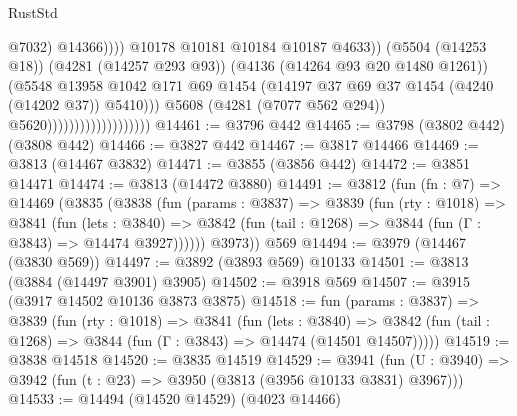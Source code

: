 \begin{lexlean}{RustStd}
\begin{coremodule}
{\begin{coremodule}
{{{{{{{{{{{{{{{{{{{{{{{{{{{{{{{{{{{                                                          @7032)
                                                        @14366))))
                                                @10178
                                                @10181
                                                @10184
                                                @10187
                                                @4633))
                                            (@5504 (@14253 @18))
                                            (@4281 (@14257 @293 @93))
                                            (@4136 (@14264 @93 @20 @1480 @1261))
                                            (@5548
                                              @13958
                                              @1042
                                              @171
                                              @69
                                              @1454
                                              (@14197
                                                @37
                                                @69
                                                @37
                                                @1454
                                                (@4240 (@14202 @37))
                                                @5410)))
                                          @5608
                                          (@4281 (@7077 @562 @294))
                                          @5620)))))))))))))))))))
@14461 := @3796 @442
@14465 := @3798 (@3802 @442) (@3808 @442)
@14466 := @3827 @442
@14467 := @3817 @14466
@14469 := @3813 (@14467 @3832)
@14471 := @3855 (@3856 @442)
@14472 := @3851 @14471
@14474 := @3813 (@14472 @3880)
@14491 := @3812
    (fun (fn : @7) =>
    @14469
      (@3835
        (@3838
          (fun (params : @3837) =>
          @3839
            (fun (rty : @1018) =>
            @3841
              (fun (lets : @3840) =>
              @3842 (fun (tail : @1268) => @3844 (fun (Γ : @3843) => @14474 @3927))))))
        @3973))
    @569
@14494 := @3979 (@14467 (@3830 @569))
@14497 := @3892 (@3893 @569) @10133
@14501 := @3813 (@3884 (@14497 @3901) @3905)
@14502 := @3918 @569
@14507 := @3915 (@3917 @14502 @10136 @3873 @3875)
@14518 := fun (params : @3837) =>
  @3839
    (fun (rty : @1018) =>
    @3841
      (fun (lets : @3840) =>
      @3842 (fun (tail : @1268) => @3844 (fun (Γ : @3843) => @14474 (@14501 @14507)))))
@14519 := @3838 @14518
@14520 := @3835 @14519
@14529 := @3941
    (fun (U : @3940) => @3942 (fun (t : @23) => @3950 (@3813 (@3956 @10133 @3831) @3967)))
@14533 := @14494 (@14520 @14529) (@4023 @14466)
}}}}}}}}}}}}}}}}}}}}}}}}}}}}}}}}}}}
\end{coremodule}}
\end{coremodule}
\end{lexlean}
